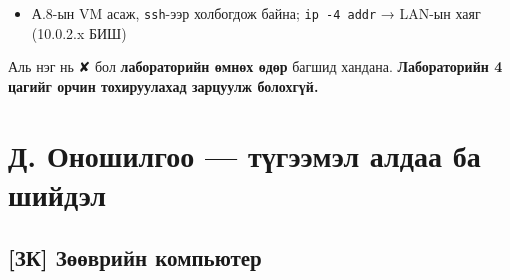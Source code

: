 \begin{itemize}
\tightlist
\item[$\square$]
  А.8-ын VM асаж, \texttt{ssh}-ээр холбогдож байна; \texttt{ip\ -4\ addr} → LAN-ын хаяг (10.0.2.x БИШ)
\end{itemize}

Аль нэг нь ✘ бол \textbf{лабораторийн өмнөх өдөр} багшид хандана. \textbf{Лабораторийн 4 цагийг орчин тохируулахад зарцуулж болохгүй.}

\hypertarget{ux434.-ux43eux43dux43eux448ux438ux43bux433ux43eux43e-ux442ux4afux433ux44dux44dux43cux44dux43b-ux430ux43bux434ux430ux430-ux431ux430-ux448ux438ux439ux434ux44dux43b}{%
\section{Д. Оношилгоо --- түгээмэл алдаа ба шийдэл}\label{ux434.-ux43eux43dux43eux448ux438ux43bux433ux43eux43e-ux442ux4afux433ux44dux44dux43cux44dux43b-ux430ux43bux434ux430ux430-ux431ux430-ux448ux438ux439ux434ux44dux43b}}

\hypertarget{ux437ux43a-ux437ux4e9ux4e9ux432ux440ux438ux439ux43d-ux43aux43eux43cux43fux44cux44eux442ux435ux440-1}{%
\subsection{{[}ЗК{]} Зөөврийн компьютер}\label{ux437ux43a-ux437ux4e9ux4e9ux432ux440ux438ux439ux43d-ux43aux43eux43cux43fux44cux44eux442ux435ux440-1}}

